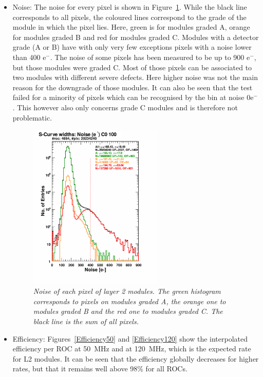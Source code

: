 \documentclass[a4paper,12pt,twoside]{article}
\begin{document}
\begin{itemize}
\item Noise:
The noise for every pixel is shown in Figure~\ref{L2Noise}. While the black line corresponds to all pixels, the coloured lines correspond to the grade of the module in which the pixel lies. Here, green is for modules graded A, orange for modules graded B and red for modules graded C. Modules with a detector grade (A or B) have with only very few exceptions pixels with a noise lower than 400 e$^-$. The noise of some pixels has been measured to be up to 900 e$^-$, but those modules were graded C. Most of those pixels can be associated to two modules with different severe defects. Here higher noise was not the main reason for the downgrade of those modules. It can also be seen that the test failed for a minority of pixels which can be recognised by the bin at noise 0e$^-$. This however also only concerns grade C modules and is therefore not problematic.

\begin{figure} [h!] \centering 
\includegraphics[width=0.6\textwidth, angle=0] {./Figures/Xray_NoisePerPixel.pdf}
\caption{\em  \label{L2Noise}
Noise of each pixel of layer 2 modules. The green histogram corresponds to pixels on modules graded A, the orange one to modules graded B and the red one to modules graded C. The black line is the sum of all pixels.}
\end{figure}

\item Efficiency: 
Figures~\ref{Efficiency50} and \ref{Efficiency120} show the interpolated efficiency per ROC at \SI{50}{\mega\hertz} and at \SI{120}{\mega\hertz}, which is the expected rate for L2 modules. It can be seen that the efficiency globally decreases for higher rates, but that it remains well above 98\% for all ROCs. 


\end{itemize}
\end{document}
